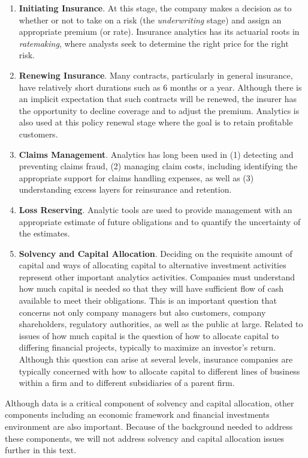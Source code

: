 \documentclass[]{book}
\begin{document}
\begin{enumerate}
\def\labelenumi{\arabic{enumi}.}
\item
  \textbf{Initiating Insurance}. At this stage, the company makes a
  decision as to whether or not to take on a risk (the
  \emph{underwriting} stage) and assign an appropriate premium (or
  rate). Insurance analytics has its actuarial roots in
  \emph{ratemaking}, where analysts seek to determine the right price
  for the right risk.
\item
  \textbf{Renewing Insurance}. Many contracts, particularly in general
  insurance, have relatively short durations such as 6 months or a year.
  Although there is an implicit expectation that such contracts will be
  renewed, the insurer has the opportunity to decline coverage and to
  adjust the premium. Analytics is also used at this policy renewal
  stage where the goal is to retain profitable customers.
\item
  \textbf{Claims Management}. Analytics has long been used in (1)
  detecting and preventing claims fraud, (2) managing claim costs,
  including identifying the appropriate support for claims handling
  expenses, as well as (3) understanding excess layers for reinsurance
  and retention.
\item
  \textbf{Loss Reserving}. Analytic tools are used to provide management
  with an appropriate estimate of future obligations and to quantify the
  uncertainty of the estimates.
\item
  \textbf{Solvency and Capital Allocation}. Deciding on the requisite
  amount of capital and ways of allocating capital to alternative
  investment activities represent other important analytics activities.
  Companies must understand how much capital is needed so that they will
  have sufficient flow of cash available to meet their obligations. This
  is an important question that concerns not only company managers but
  also customers, company shareholders, regulatory authorities, as well
  as the public at large. Related to issues of how much capital is the
  question of how to allocate capital to differing financial projects,
  typically to maximize an investor's return. Although this question can
  arise at several levels, insurance companies are typically concerned
  with how to allocate capital to different lines of business within a
  firm and to different subsidiaries of a parent firm.
\end{enumerate}

Although data is a critical component of solvency and capital
allocation, other components including an economic framework and
financial investments environment are also important. Because of the
background needed to address these components, we will not address
solvency and capital allocation issues further in this text.
\end{document}
